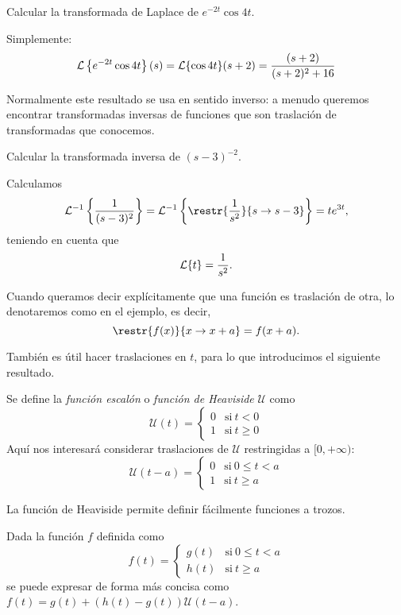 \documentclass[../ecuaciones_diferenciales.tex]{subfiles}
\begin{document}
\begin{example}
	Calcular la transformada de Laplace de \(e^{-2t} \cos 4t\).
\end{example}

\begin{solution}
	Simplemente:
	\[\mathcal{L}\left\{e^{-2t} \cos 4t\right\}(s) = \mathcal{L}\{\cos 4t\}(s+2)
		= \frac{(s+2)}{(s+2)^2+16}\]
\end{solution}

Normalmente este resultado se usa en sentido inverso: a menudo queremos
encontrar transformadas inversas de funciones que son traslación de
transformadas que conocemos.

\begin{example}
	Calcular la transformada inversa de \((s-3)^{-2}\).
\end{example}

\begin{solution}
	Calculamos
	\[\L^{-1}\left\{\frac{1}{(s-3)^2}\right\} = \L^{-1}\left\{\restr{\frac{1}{s^2}}{s
			\to s-3}\right\} = te^{3t},\]
	teniendo en cuenta que
	\[\mathcal{L}\{t\} = \frac{1}{s^2}.\]
\end{solution}

\begin{notation}
	Cuando queramos decir explícitamente que una función es
	traslación de otra, lo denotaremos como en el ejemplo, es decir,
	\[\restr{f(x)}{x \to x+a} = f(x+a).\]
\end{notation}

También es útil hacer traslaciones en \(t\), para lo que introducimos el
siguiente resultado.

\begin{definition}
	Se define la \emph{función escalón} o \emph{función de Heaviside} \(\mathcal{U}\) como
	\[\mathcal{U}(t) =
		\begin{cases}
			0 & \mathrm{si}\ t < 0    \\
			1 & \mathrm{si}\ t \geq 0
		\end{cases}
	\]
	Aquí nos interesará considerar traslaciones de \(\mathcal{U}\) restringidas a
	\([0,+\infty)\):
	\[\mathcal{U}(t-a) =
		\begin{cases}
			0 & \mathrm{si}\ 0 \leq t < a \\
			1 & \mathrm{si}\ t \geq a
		\end{cases}
	\]
\end{definition}

La función de Heaviside permite definir fácilmente funciones a trozos.

\begin{example}
	Dada la función \(f\) definida como
	\[f(t) =
		\begin{cases}
			g(t) & \mathrm{si}\ 0 \leq t < a \\
			h(t) & \mathrm{si}\ t \geq a
		\end{cases}
	\]
	se puede expresar de forma más concisa como
	\(f(t) = g(t) + (h(t)-g(t))\mathcal{U}(t-a)\).
\end{example}
\end{document}
